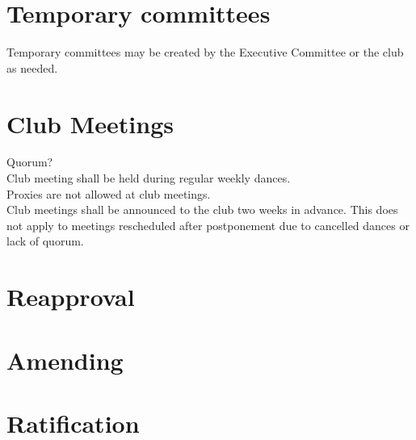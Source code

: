 \documentclass{article}
\begin{document}
\section {Temporary committees}
Temporary committees may be created by the Executive Committee or the
club as needed.
\section {Club Meetings}
Quorum?\\
Club meeting shall be held during regular weekly dances. \\
Proxies are not allowed at club meetings. \\
Club meetings shall be announced to the club two weeks in advance. This does not apply to meetings rescheduled after postponement due to cancelled dances or lack of quorum. \\
\section{Reapproval}
\section{Amending}
\section{Ratification}
\end{document}
